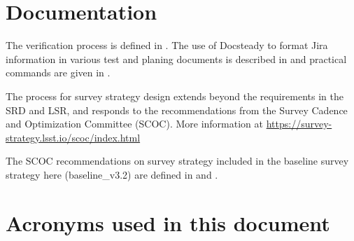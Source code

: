 

\newpage
\appendix
\section{Documentation}
The verification process is defined in .
The use of Docsteady to format Jira information in various test and planing documents is
described in  and practical commands are given in .

The process for survey strategy design extends beyond the requirements in the SRD and LSR, 
and responds to the recommendations from the Survey Cadence and Optimization Committee (SCOC). 
More information at \url{https://survey-strategy.lsst.io/scoc/index.html}

The SCOC recommendations on survey strategy included in the baseline survey strategy here (baseline\_v3.2) are defined in 
 and . 

\section{Acronyms used in this document}\label{sec:acronyms}


\newpage

%
